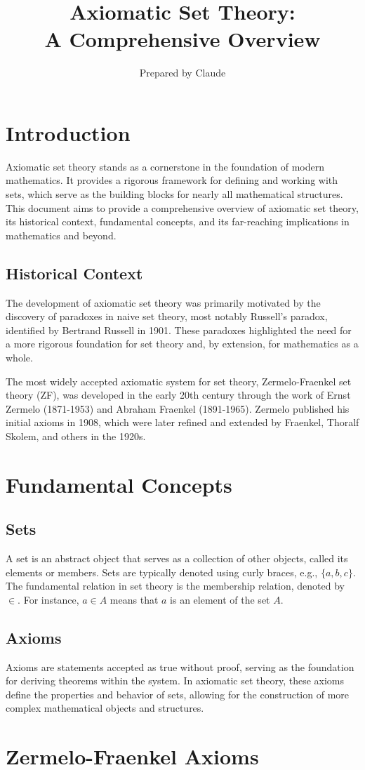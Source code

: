 \documentclass[12pt,a4paper]{article}
\title{\textcolor{draculaYellow}{\Huge Axiomatic Set Theory: \\[0.5em] \large A Comprehensive Overview}}
\author{\textcolor{draculaCyan}{Prepared by Claude}}
\date{}
\newcommand{\sectiontitle}[1]{\section{\textcolor{draculaPurple}{#1}}}
\newcommand{\subsectiontitle}[1]{\subsection{\textcolor{draculaPink}{#1}}}
\newcommand{\concept}[1]{\textcolor{draculaGreen}{#1}}
\begin{document}
\maketitle

\tableofcontents

\sectiontitle{Introduction}

Axiomatic set theory stands as a cornerstone in the foundation of modern mathematics. It provides a rigorous framework for defining and working with sets, which serve as the building blocks for nearly all mathematical structures. This document aims to provide a comprehensive overview of axiomatic set theory, its historical context, fundamental concepts, and its far-reaching implications in mathematics and beyond.

\subsectiontitle{Historical Context}

The development of axiomatic set theory was primarily motivated by the discovery of paradoxes in naive set theory, most notably Russell's paradox, identified by Bertrand Russell in 1901. These paradoxes highlighted the need for a more rigorous foundation for set theory and, by extension, for mathematics as a whole.

The most widely accepted axiomatic system for set theory, Zermelo-Fraenkel set theory (ZF), was developed in the early 20th century through the work of Ernst Zermelo (1871-1953) and Abraham Fraenkel (1891-1965). Zermelo published his initial axioms in 1908, which were later refined and extended by Fraenkel, Thoralf Skolem, and others in the 1920s.

\sectiontitle{Fundamental Concepts}

\subsectiontitle{Sets}

A \concept{set} is an abstract object that serves as a collection of other objects, called its elements or members. Sets are typically denoted using curly braces, e.g., $\{a, b, c\}$. The fundamental relation in set theory is the membership relation, denoted by $\in$. For instance, $a \in A$ means that $a$ is an element of the set $A$.

\subsectiontitle{Axioms}

\concept{Axioms} are statements accepted as true without proof, serving as the foundation for deriving theorems within the system. In axiomatic set theory, these axioms define the properties and behavior of sets, allowing for the construction of more complex mathematical objects and structures.

\sectiontitle{Zermelo-Fraenkel Axioms}
\end{document}
